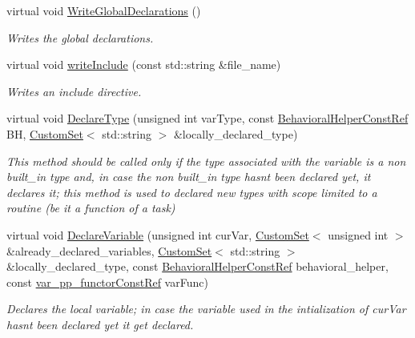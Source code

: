 \begin{DoxyCompactItemize}
virtual void \hyperlink{classCWriter_a42b2b558bd1efb2dc637664f5df4df28}{Write\+Global\+Declarations} ()
\begin{DoxyCompactList}\small\item\em Writes the global declarations. \end{DoxyCompactList}\item 
virtual void \hyperlink{classCWriter_a736e4e43725523bf3775ed54a9044997}{write\+Include} (const std\+::string \&file\+\_\+name)
\begin{DoxyCompactList}\small\item\em Writes an include directive. \end{DoxyCompactList}\item 
virtual void \hyperlink{classCWriter_a34b098dce3408ece8f310af807c52368}{Declare\+Type} (unsigned int var\+Type, const \hyperlink{behavioral__helper_8hpp_aae973b54cac87eef3b27442aa3e1e425}{Behavioral\+Helper\+Const\+Ref} BH, \hyperlink{custom__set_8hpp_a615bc2f42fc38a4bb1790d12c759e86f}{Custom\+Set}$<$ std\+::string $>$ \&locally\+\_\+declared\+\_\+type)
\begin{DoxyCompactList}\small\item\em This method should be called only if the type associated with the variable is a non built\+\_\+in type and, in case the non built\+\_\+in type hasn\textquotesingle{}t been declared yet, it declares it; this method is used to declared new types with scope limited to a routine (be it a function of a task) \end{DoxyCompactList}\item 
virtual void \hyperlink{classCWriter_a93167492cece9b71202aa311930b355d}{Declare\+Variable} (unsigned int cur\+Var, \hyperlink{custom__set_8hpp_a615bc2f42fc38a4bb1790d12c759e86f}{Custom\+Set}$<$ unsigned int $>$ \&already\+\_\+declared\+\_\+variables, \hyperlink{custom__set_8hpp_a615bc2f42fc38a4bb1790d12c759e86f}{Custom\+Set}$<$ std\+::string $>$ \&locally\+\_\+declared\+\_\+type, const \hyperlink{behavioral__helper_8hpp_aae973b54cac87eef3b27442aa3e1e425}{Behavioral\+Helper\+Const\+Ref} behavioral\+\_\+helper, const \hyperlink{var__pp__functor_8hpp_a8a6b51b6519401d911398943510557f0}{var\+\_\+pp\+\_\+functor\+Const\+Ref} var\+Func)
\begin{DoxyCompactList}\small\item\em Declares the local variable; in case the variable used in the intialization of cur\+Var hasn\textquotesingle{}t been declared yet it get declared. \end{DoxyCompactList}\item 

\end{DoxyCompactItemize}
